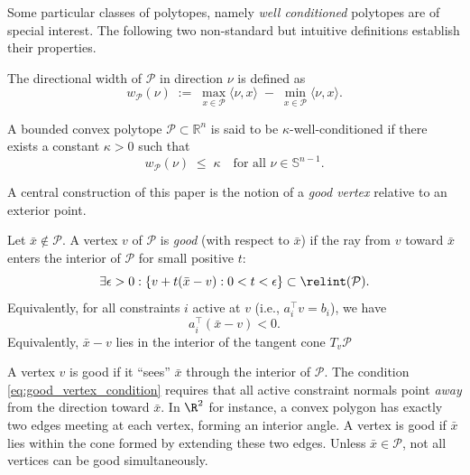 Some particular classes of polytopes, namely \textit{well conditioned} polytopes are of special interest. The following two non-standard but intuitive definitions establish their properties.

\begin{definition}
The directional width of $\mathcal P$
in direction $\nu$ is defined as
\[
w_{\mathcal P}(\nu)
\;:=\;
\max_{x \in \mathcal P} \langle \nu, x \rangle
\;-\;
\min_{x \in \mathcal P} \langle \nu, x \rangle.
\]
\end{definition}
\begin{definition}\label{def:well_behaved}
A bounded convex polytope $\mathcal P \subset \mathbb R^n$ is said to be
$\kappa$-well-conditioned if there exists a constant $\kappa > 0$ such that
\[
w_{\mathcal P}(\nu) \;\le\; \kappa
\quad \text{for all } \nu \in \mathbb S^{n-1}.
\]
\end{definition}

A central construction of this paper is the notion of a \emph{good vertex} relative to an exterior point.

\begin{definition}\label{def:good_vertex}
Let $\bar{x} \notin \mathcal{P}$. A vertex $v$ of $\mathcal{P}$ is \emph{good} (with respect to $\bar{x}$) if the ray from $v$ toward $\bar{x}$ enters the interior of $\mathcal{P}$ for small positive $t$:
\begin{equation}
\exists \epsilon > 0 : \{v + t(\bar{x} - v) : 0 < t < \epsilon\} \subset \relint(\mathcal{P}).
\end{equation}
Equivalently, for all constraints $i$ active at $v$ (i.e., $a_i^\top v = b_i$), we have
\begin{equation}\label{eq:good_vertex_condition}
a_i^\top(\bar{x} - v) < 0.
\end{equation}
Equivalently, $\bar{x} - v$ lies in the interior of the tangent cone 
$T_v\mathcal{P}$
\end{definition}

\begin{remark}\label{rem:good_intuition}
A vertex $v$ is good if it \enquote{sees} $\bar{x}$ through the interior of $\mathcal{P}$. The condition \eqref{eq:good_vertex_condition} requires that all active constraint normals point \emph{away} from the direction toward $\bar{x}$. In $\R^2$ for instance, a convex polygon has exactly two edges meeting at each vertex, forming an interior angle. A vertex is good if $\bar{x}$ lies within the cone formed by extending these two edges. Unless $\bar{x} \in \mathcal{P}$, not all vertices can be good simultaneously.
\end{remark}

